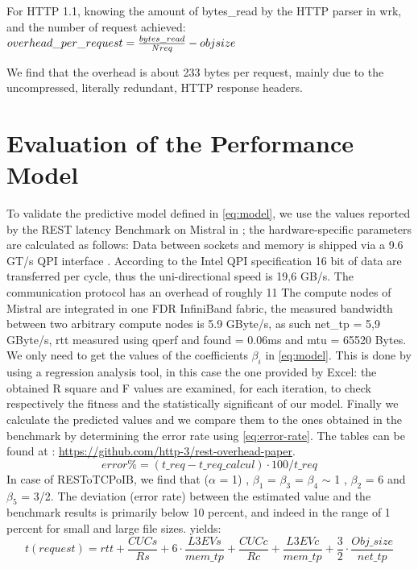 \documentclass[runningheads]{llncs}
\begin{document}
For HTTP 1.1, knowing the amount of bytes\_read by the HTTP parser in wrk, and the number of request achieved:
$ overhead\_per\_request=\frac{bytes\_read}{Nreq} - obj\-size $

We find that the overhead is about 233 bytes per request, mainly due to the uncompressed, literally redundant, HTTP response headers.
\section{Evaluation of the Performance Model} \label{sec:evaluation}
To validate the predictive model defined in \cref{eq:model}, we use the values reported by the REST latency Benchmark on Mistral in ; the hardware-specific parameters are calculated as follows:
Data between sockets and memory is shipped via a 9.6 GT/s QPI interface \cite{intel-xeon}. According to the Intel QPI specification \cite{intel-qpi} 16 bit of data are transferred per cycle, thus the uni-directional speed is 19,6 GB/s. The communication protocol has an overhead of roughly 11 %
The compute nodes of Mistral are integrated in one FDR InfiniBand fabric, the measured bandwidth between two arbitrary compute nodes is 5.9 GByte/s, as such net\_tp = 5,9 GByte/s, rtt measured using qperf and found = 0.06ms and mtu = 65520 Bytes.
We only need to get the values of the coefficients $\beta_i$ in \cref{eq:model}. This is done by using a regression analysis tool, in this case the one provided by Excel: the obtained R square and F values are examined, for each iteration, to check respectively the fitness and the statistically significant of our model. Finally we calculate the predicted values and we compare them to the ones obtained in the benchmark by determining the error rate using \cref{eq:error-rate}. The tables can be found at : \href{https://github.com/http-3/rest-overhead-paper}{https://github.com/http-3/rest-overhead-paper}.
\begin{equation}
 error\%=(t\_req -t\_req\_calcul)\cdot100/t\_req
\label{eq:error-rate}
\end{equation}
In case of RESToTCPoIB, we find that ($\alpha$ = 1) , $\beta_1$ = $\beta_3$ = $\beta_4$ $\sim$ 1 , $\beta_2$ = 6 and $\beta_5$ = 3/2. 
The deviation (error rate) between the estimated value and the benchmark results is primarily below 10 percent, and indeed in the range of 1 percent for small and large file sizes. yields:
\begin{equation}
\label{eq:model-rest}
t(request)=rtt+\frac{CUCs}{Rs}+6\cdot\frac{L3EVs}{mem\_tp}+\frac{CUCc}{Rc}+\frac{L3EVc}{mem\_tp}+\frac{3}{2}\cdot\frac{Obj\_size}{net\_tp}
\end{equation}
\end{document}
